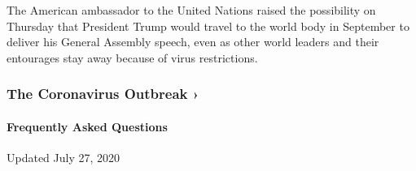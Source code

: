 The American ambassador to the United Nations raised the possibility on
Thursday that President Trump would travel to the world body in
September to deliver his General Assembly speech, even as other world
leaders and their entourages stay away because of virus restrictions.

\href{https://www.nytimes.com/news-event/coronavirus?action=click\&pgtype=Article\&state=default\&region=MAIN_CONTENT_3\&context=storylines_faq}{}

\hypertarget{the-coronavirus-outbreak-}{%
\subsubsection{The Coronavirus Outbreak
›}\label{the-coronavirus-outbreak-}}

\hypertarget{frequently-asked-questions}{%
\paragraph{Frequently Asked
Questions}\label{frequently-asked-questions}}

Updated July 27, 2020


